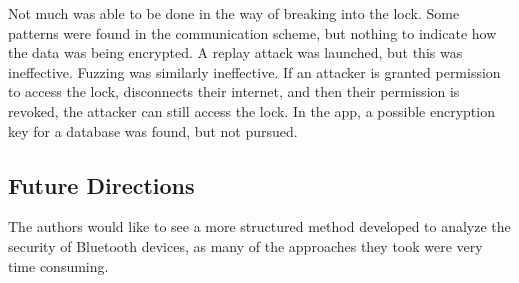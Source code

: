 \documentclass[letterpaper,12pt]{article}
\begin{document}
\noindent
Not much was able to be done in the way of breaking into the lock. Some patterns were found in the communication scheme, but nothing to indicate how the data was being encrypted. A replay attack was launched, but this was ineffective. Fuzzing was similarly ineffective. If an attacker is granted permission to access the lock, disconnects their internet, and then their permission is revoked, the attacker can still access the lock. In the app, a possible encryption key for a database was found, but not pursued. 

\subsection{Future Directions}

\noindent
The authors would like to see a more structured method developed to analyze the security of Bluetooth devices, as many of the approaches they took were very time consuming. 

\pagebreak


\end{document}
